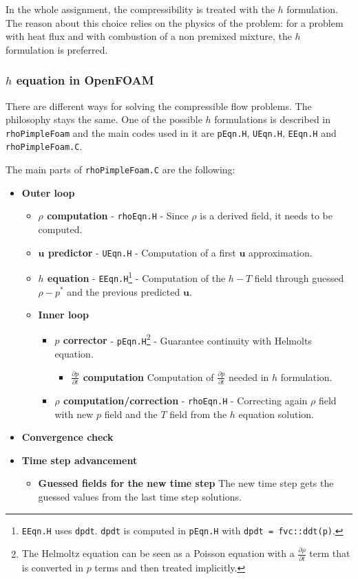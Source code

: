 In the whole assignment, the compressibility is treated with the $h$ formulation. The reason about this choice relies on the physics of the problem: for a problem with heat flux and with combustion of a non premixed mixture, the $h$ formulation is preferred.

\subsubsection{$h$ equation in OpenFOAM}
There are different ways for solving the compressible flow problems. The philosophy stays the same. One of the possible $h$ formulations is described in \verb|rhoPimpleFoam| and the main codes used in it are \verb|pEqn.H|, \verb|UEqn.H|, \verb|EEqn.H| and \verb|rhoPimpleFoam.C|. 

The main parts of \verb|rhoPimpleFoam.C| are the following: 
\begin{itemize}
    \item \textbf{Outer loop}
    \begin{itemize}
        \item \textbf{$\rho$ computation} - \verb|rhoEqn.H| - Since $\rho$ is a derived field, it needs to be computed. 
        \item \textbf{$\boldsymbol{u}$ predictor} - \verb|UEqn.H| - Computation of a first $\boldsymbol{u}$ approximation. 
        \item \textbf{$h$ equation} - \verb|EEqn.H|\cprotect\footnote{\verb|EEqn.H| uses \verb|dpdt|. \verb|dpdt| is computed in \verb|pEqn.H| with \verb|dpdt = fvc::ddt(p)|.} - Computation of the $h - T$ field through guessed $\rho - p^*$ and the previous predicted $\boldsymbol{u}$. 
        \item \textbf{Inner loop}
        \begin{itemize}
            \item \textbf{$p$ corrector} - \verb|pEqn.H|\cprotect\footnote{The Helmoltz equation can be seen as a Poisson equation with a $\frac{\partial \rho}{\partial t}$ term that is converted in $p$ terms and then treated implicitly.} - Guarantee continuity with Helmolts equation.
            \begin{itemize}
                \item \textbf{$\frac{\partial p}{\partial t}$ computation} Computation of $\frac{\partial p}{\partial t}$ needed in $h$ formulation.
            \end{itemize}
            \item \textbf{$\rho$ computation/correction} - \verb|rhoEqn.H| - Correcting again $\rho$ field with new $p$ field and the $T$ field from the $h$ equation solution.
    \end{itemize}
    \end{itemize}
    \item \textbf{Convergence check}
    \item \textbf{Time step advancement}
    \begin{itemize}
        \item \textbf{Guessed fields for the new time step} The new time step gets the guessed values from the last time step solutions.
    \end{itemize}
\end{itemize}

